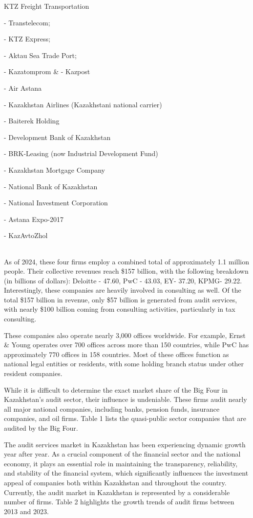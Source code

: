 \begin{longtable}[]
KTZ Freight Transportation

- Transtelecom;

- KTZ Express;

- Aktau Sea Trade Port;

- Kazatomprom & - Kazpost

- Air Astana

- Kazakhstan Airlines (Kazakhstani national carrier)

- Baiterek Holding

- Development Bank of Kazakhstan

- BRK-Leasing (now Industrial Development Fund)

- Kazakhstan Mortgage Company

- National Bank of Kazakhstan

- National Investment Corporation

- Astana Expo-2017

- KazAvtoZhol \\
\hline
{} \\
\end{longtable}

\begin{multicols}{2}
As of 2024, these four firms employ a combined total of approximately
1.1 million people. Their collective revenues reach \$157 billion, with
the following breakdown (in billions of dollars): Deloitte - 47.60, PwC
- 43.03, EY- 37.20, KPMG- 29.22. Interestingly, these companies are
heavily involved in consulting as well. Of the total \$157 billion in
revenue, only \$57 billion is generated from audit services, with nearly
\$100 billion coming from consulting activities, particularly in tax
consulting.

These companies also operate nearly 3,000 offices worldwide. For
example, Ernst \& Young operates over 700 offices across more than 150
countries, while PwC has approximately 770 offices in 158 countries.
Most of these offices function as national legal entities or residents,
with some holding branch status under other resident companies.

While it is difficult to determine the exact market share of the Big
Four in Kazakhstan's audit sector, their influence is undeniable. These
firms audit nearly all major national companies, including banks,
pension funds, insurance companies, and oil firms. Table 1 lists the
quasi-public sector companies that are audited by the Big Four.

The audit services market in Kazakhstan has been experiencing dynamic
growth year after year. As a crucial component of the financial sector
and the national economy, it plays an essential role in maintaining the
transparency, reliability, and stability of the financial system, which
significantly influences the investment appeal of companies both within
Kazakhstan and throughout the country. Currently, the audit market in
Kazakhstan is represented by a considerable number of firms. Table 2
highlights the growth trends of audit firms between 2013 and 2023.
\end{multicols}

